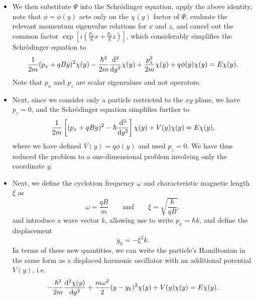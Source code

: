 \documentclass[11pt, a4paper]{article}
\newcommand{\eqtext}[1]{\qquad \text{#1} \qquad}
\newcommand{\Schro}{Schr\"{o}dinger\xspace}
\newcommand{\Ham}{Hamiltonian\xspace}
\renewcommand{\P}{\Psi}  %
\begin{document}
\begin{itemize}
    \item We then substitute $ \P $ into the \Schro equation, apply the above identity, note that $ \phi = \phi(y) $ acts only on the $ \chi(y) $ factor of $ \P $, evaluate the relevant momentum eigenvalue relations for $ x $ and $ z $, and cancel out the common factor $ \exp\left[i \left(\frac{p_{x}}{\hbar}x + \frac{p_{z}}{\hbar}z \right)\right] $, which considerably simplifies the \Schro equation to
	\begin{equation*}
		\frac{1}{2m}(p_{x} + qBy)^{2}\chi(y) - \frac{\hbar^{2}}{2m}\dv[2]{}{y}\chi(y) + \frac{p^{2}_{z}}{2m}\chi(y) + q\phi(y)\chi(y) = E\chi(y).
	\end{equation*}
	Note that $ p_{x} $ and $ p_{z} $ are scalar eigenvalues and not operators. 

    \item Next, since we consider only a particle restricted to the  $ xy $ plane, we have $ p_{z} = 0 $, and the \Schro equation simplifies further to
	\begin{equation*}
		\frac{1}{2m}\left[(p_{x} + qBy)^{2} - \hbar \dv[2]{}{y}\right]\chi(y) + V(y)\chi(y) = E\chi(y),
	\end{equation*}
	where we have defined $ V(y) = q\phi(y) $ and used $ p_{z} = 0 $. We have thus reduced the problem to a one-dimensional problem involving only the coordinate $ y $. 
	
	\item Next, we define the cyclotron frequency $  \omega  $ and characteristic magnetic length $ \xi $ as
	\begin{equation*}
		\omega = \frac{qB}{m} \eqtext{and} \xi = \sqrt{\frac{\hbar}{qB}},
	\end{equation*}
	and introduce a wave vector $ k $, allowing use to write $ p_{x} = \hbar k $, and define the displacement
    \begin{equation*}
        y_{k} = - \xi^{2} k.
    \end{equation*}
    In terms of these new quantities, we can write the particle's \Ham in the same form as a displaced harmonic oscillator with an additional potential $ V(y) $, i.e.
	\begin{equation*}
		-\frac{\hbar^{2}}{2m} \dv[2]{\chi(y)}{y} + \frac{m\omega^{2}}{2}(y - y_{k})^{2}\chi(y) + V(y)\chi(y) = E\chi(y).
	\end{equation*}
	

\end{itemize}
\end{document}
